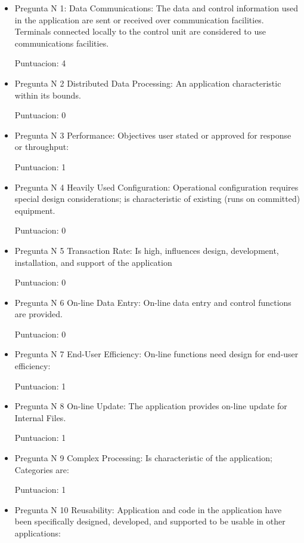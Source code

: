    \begin{itemize}
   \item Pregunta N 1: Data Communications: The data and control information used in the application are sent or received over communication facilities. Terminals connected locally to the control unit are considered to use communications facilities.
   
   Puntuacion: 4
   
   \item Pregunta N 2 Distributed Data Processing: An application characteristic within its bounds.

    Puntuacion: 0
    
    \item Pregunta N 3  Performance: Objectives user stated or approved for response or throughput:

    Puntuacion: 1
    
    \item Pregunta N 4 Heavily Used Configuration: Operational configuration requires special design considerations; is characteristic of existing (runs on committed) equipment.


    Puntuacion: 0
    
    \item Pregunta N 5 Transaction Rate: Is high, influences design, development, installation, and support of the application

    Puntuacion: 0
    
    \item Pregunta N 6 On-line Data Entry: On-line data entry and control functions are provided.


    Puntuacion: 0
    
    \item Pregunta N 7 End-User Efficiency: On-line functions need design for end-user efficiency:

    Puntuacion: 1
    
    \item Pregunta N 8 On-line Update: The application provides on-line update for Internal Files.

    Puntuacion: 1
    
    \item Pregunta N 9 Complex Processing: Is characteristic of the application; Categories are:


    Puntuacion: 1
    
    \item Pregunta N 10 Reusability: Application and code in the application have been specifically designed, developed, and supported to be usable in other applications:


\end{itemize}
